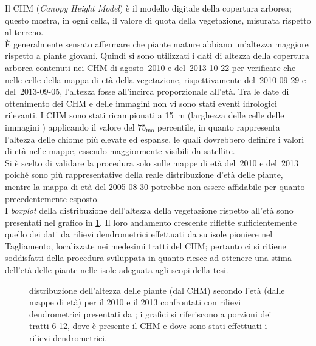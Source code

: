 Il CHM (\emph{Canopy Height Model}) è il modello digitale della copertura arborea; questo mostra, in ogni cella, il valore di quota della vegetazione, misurata rispetto al terreno.
\\
È generalmente sensato affermare che piante mature abbiano un'altezza maggiore rispetto a piante giovani.
Quindi si sono utilizzati i dati di altezza della copertura arborea contenuti nei CHM di agosto~2010 e del~2013-10-22 per verificare che nelle celle della mappa di età della vegetazione, rispettivamente del~2010-09-29 e del~2013-09-05, l'altezza fosse all'incirca proporzionale all'età.
Tra le date di ottenimento dei CHM e delle immagini \AST{} non vi sono stati eventi idrologici rilevanti.
I CHM sono stati ricampionati a \SI{15}{\m} (larghezza delle celle delle immagini \AST{}) applicando il valore del $75_{\mathrm{mo}}$ percentile, in quanto rappresenta l'altezza delle chiome più elevate ed espanse, le quali dovrebbero definire i valori di età nelle mappe, essendo maggiormente visibili da satellite.
\\
Si è scelto di validare la procedura solo sulle mappe di età del~2010 e del~2013 poiché sono più rappresentative della reale distribuzione d'età delle piante, mentre la mappa di età del 2005-08-30 potrebbe non essere affidabile per quanto precedentemente esposto.
\\
I \emph{boxplot} della distribuzione dell'altezza della vegetazione rispetto all'età sono presentati nel grafico in \cref{graph:altezza-chm-eta}.
Il loro andamento crescente riflette sufficientemente quello dei dati da rilievi dendrometrici effettuati da  su isole pioniere nel Tagliamento, localizzate nei medesimi tratti del CHM; pertanto ci si ritiene soddisfatti della procedura sviluppata in quanto riesce ad ottenere una stima dell'età delle piante nelle isole adeguata agli scopi della tesi.
%
\begin{figure}
	\centering
	
	\caption[distribuzione dell'altezza delle piante secondo l'età]{distribuzione dell'altezza delle piante (dal CHM) secondo l'età (dalle mappe di età) per il 2010 e il 2013 confrontati con rilievi dendrometrici presentati da ; i grafici si riferiscono a porzioni dei tratti 6-12, dove è presente il CHM e dove sono stati effettuati i rilievi dendrometrici.}
	\label{graph:altezza-chm-eta}
\end{figure}
%


